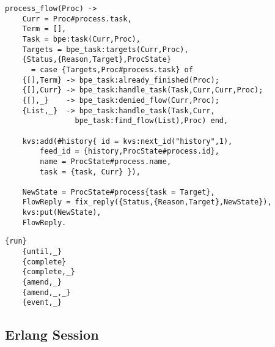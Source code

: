 \newpage
\vspace{1\baselineskip}
\begin{lstlisting}[caption=Flow Processing]
  process_flow(Proc) ->
    Curr = Proc#process.task,
    Term = [],
    Task = bpe:task(Curr,Proc),
    Targets = bpe_task:targets(Curr,Proc),
    {Status,{Reason,Target},ProcState}
      = case {Targets,Proc#process.task} of
    {[],Term} -> bpe_task:already_finished(Proc);
    {[],Curr} -> bpe_task:handle_task(Task,Curr,Curr,Proc);
    {[],_}    -> bpe_task:denied_flow(Curr,Proc);
    {List,_}  -> bpe_task:handle_task(Task,Curr,
                bpe_task:find_flow(List),Proc) end,

    kvs:add(#history{ id = kvs:next_id("history",1),
        feed_id = {history,ProcState#process.id},
        name = ProcState#process.name,
        task = {task, Curr} }),

    NewState = ProcState#process{task = Target},
    FlowReply = fix_reply({Status,{Reason,Target},NewState}),
    kvs:put(NewState),
    FlowReply.
\end{lstlisting}

\vspace{1\baselineskip}
\begin{lstlisting}[caption=BPE protocol]
    {run}
    {until,_}
    {complete}
    {complete,_}
    {amend,_}
    {amend,_,_}
    {event,_}
\end{lstlisting}

\newpage
\subsection{Erlang Session}

